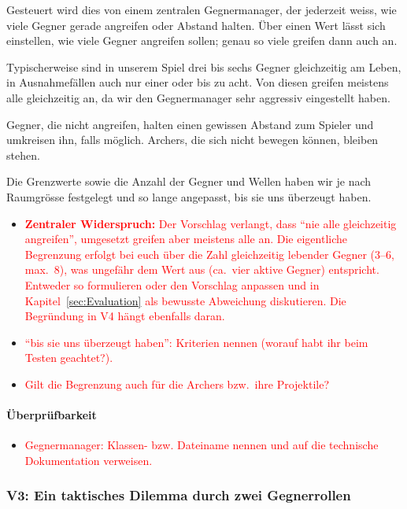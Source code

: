\documentclass[../Main.tex]{subfiles}
\begin{document}
Gesteuert wird dies von einem zentralen Gegnermanager, der jederzeit weiss, wie viele Gegner gerade angreifen oder Abstand halten. Über einen Wert lässt sich einstellen, wie viele Gegner angreifen sollen; genau so viele greifen dann auch an.

Typischerweise sind in unserem Spiel drei bis sechs Gegner gleichzeitig am Leben, in Ausnahmefällen auch nur einer oder bis zu acht. Von diesen greifen meistens alle gleichzeitig an, da wir den Gegnermanager sehr aggressiv eingestellt haben.

Gegner, die nicht angreifen, halten einen gewissen Abstand zum Spieler und umkreisen ihn, falls möglich. Archers, die sich nicht bewegen können, bleiben stehen.

Die Grenzwerte sowie die Anzahl der Gegner und Wellen haben wir je nach Raumgrösse festgelegt und so lange angepasst, bis sie uns überzeugt haben.

\begin{itemize}[leftmargin=1.5cm]
    \item \textcolor{red}{\textbf{Zentraler Widerspruch:} Der Vorschlag verlangt, dass \enquote{nie alle gleichzeitig angreifen}, umgesetzt greifen aber meistens alle an. Die eigentliche Begrenzung erfolgt bei euch über die Zahl gleichzeitig lebender Gegner (3--6, max.\ 8), was ungefähr dem Wert aus  (ca.\ vier aktive Gegner) entspricht. Entweder so formulieren oder den Vorschlag anpassen und in Kapitel~\ref{sec:Evaluation} als bewusste Abweichung diskutieren. Die Begründung in V4 hängt ebenfalls daran.}
    \item \textcolor{red}{\enquote{bis sie uns überzeugt haben}: Kriterien nennen (worauf habt ihr beim Testen geachtet?).}
    \item \textcolor{red}{Gilt die Begrenzung auch für die Archers bzw.\ ihre Projektile?}
\end{itemize}

\paragraph{Überprüfbarkeit}
\begin{itemize}[leftmargin=1.5cm]
    \item \textcolor{red}{Gegnermanager: Klassen- bzw. Dateiname nennen und auf die technische Dokumentation verweisen.}
\end{itemize}

\subsubsection{V3: Ein taktisches Dilemma durch zwei Gegnerrollen} \label{sec:V3}
\end{document}
